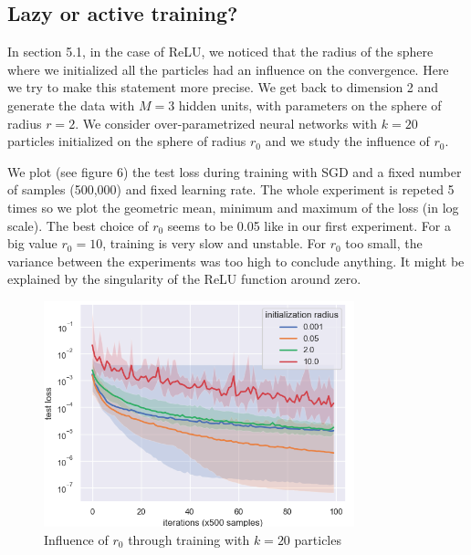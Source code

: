 \documentclass[a4paper, 11pt]{scrartcl}
\begin{document}
{\subsection{Lazy or active training?}

In section 5.1, in the case of ReLU, we noticed that the radius of the sphere where we initialized all the particles had an influence on the convergence. Here we try to make this statement more precise. We get back to dimension 2 and generate the data with $M=3$ hidden units, with parameters on the sphere of radius $r=2$. We consider over-parametrized neural networks with $k=20$ particles initialized on the sphere of radius $r_0$ and we study the influence of $r_0$.

We plot (see figure 6) the test loss during training with SGD and a fixed number of samples (500,000) and fixed learning rate. The whole experiment is repeted 5 times so we plot the geometric mean, minimum and maximum of the loss (in log scale). The best choice of $r_0$ seems to be 0.05 like in our first experiment. For a big value $r_0 = 10$, training is very slow and unstable. For $r_0$ too small, the variance between the experiments was too high to conclude anything. It might be explained by the singularity of the ReLU function around zero.

\begin{figure}[h]
\centering
\includegraphics[width=9cm]{radius.png}
  \caption{Influence of $r_0$ through training with $k=20$ particles}
  \label{fig:3}
\end{figure}

}
\end{document}
